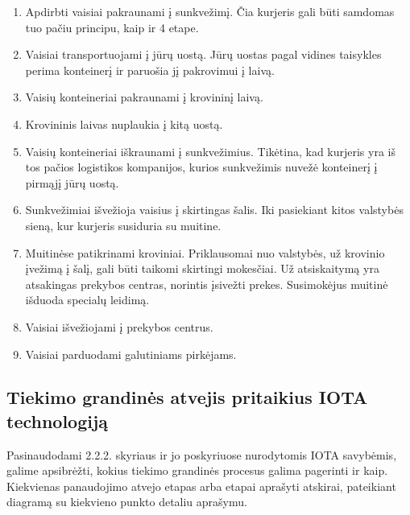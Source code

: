 \begin{enumerate}
    \item Apdirbti vaisiai pakraunami į sunkvežimį. Čia kurjeris gali būti samdomas tuo pačiu principu, kaip ir 4 etape.
    \item Vaisiai transportuojami į jūrų uostą. Jūrų uostas pagal vidines taisykles perima konteinerį ir paruošia jį pakrovimui į laivą.
    \item Vaisių konteineriai pakraunami į krovininį laivą.
    \item Krovininis laivas nuplaukia į kitą uostą.
    \item Vaisių konteineriai iškraunami į sunkvežimius. Tikėtina, kad kurjeris yra iš tos pačios logistikos kompanijos, kurios sunkvežimis nuvežė konteinerį į pirmąjį jūrų uostą.
    \item Sunkvežimiai išvežioja vaisius į skirtingas šalis. Iki pasiekiant kitos valstybės sieną, kur kurjeris susiduria su muitine.
    \item Muitinėse patikrinami kroviniai. Priklausomai nuo valstybės, už krovinio įvežimą į šalį, gali būti taikomi skirtingi mokesčiai. Už atsiskaitymą yra atsakingas prekybos centras, norintis įsivežti prekes. Susimokėjus muitinė išduoda specialų leidimą.
    \item Vaisiai išvežiojami į prekybos centrus.
    \item Vaisiai parduodami galutiniams pirkėjams.
\end{enumerate}




\subsection{Tiekimo grandinės atvejis pritaikius IOTA technologiją}

Pasinaudodami 2.2.2. skyriaus ir jo poskyriuose nurodytomis IOTA savybėmis, galime apsibrėžti, kokius tiekimo grandinės procesus galima pagerinti ir kaip. Kiekvienas panaudojimo atvejo etapas arba etapai aprašyti atskirai, pateikiant diagramą su kiekvieno punkto detaliu aprašymu.




